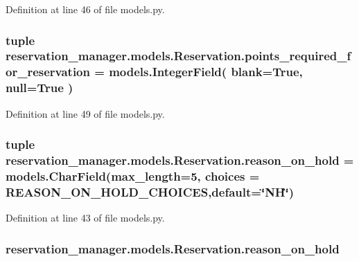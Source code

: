 Definition at line 46 of file models.\-py.

\hypertarget{classreservation__manager_1_1models_1_1Reservation_a30f975d5fa7a98aed94b7950522f912e}{
\subsubsection[{points\-\_\-required\-\_\-for\-\_\-reservation}]{\setlength{\rightskip}{0pt plus 5cm}tuple reservation\-\_\-manager.\-models.\-Reservation.\-points\-\_\-required\-\_\-for\-\_\-reservation = models.\-Integer\-Field( blank=True, null=True )\hspace{0.3cm}{\ttfamily [static]}}}\label{classreservation__manager_1_1models_1_1Reservation_a30f975d5fa7a98aed94b7950522f912e}


Definition at line 49 of file models.\-py.

\hypertarget{classreservation__manager_1_1models_1_1Reservation_a05bba6cb6791c1aadf552795174c1be7}{
\subsubsection[{reason\-\_\-on\-\_\-hold}]{\setlength{\rightskip}{0pt plus 5cm}tuple reservation\-\_\-manager.\-models.\-Reservation.\-reason\-\_\-on\-\_\-hold = models.\-Char\-Field(max\-\_\-length=5, choices = {\bf R\-E\-A\-S\-O\-N\-\_\-\-O\-N\-\_\-\-H\-O\-L\-D\-\_\-\-C\-H\-O\-I\-C\-E\-S},default=\char`\"{}N\-H\char`\"{})\hspace{0.3cm}{\ttfamily [static]}}}\label{classreservation__manager_1_1models_1_1Reservation_a05bba6cb6791c1aadf552795174c1be7}


Definition at line 43 of file models.\-py.

\hypertarget{classreservation__manager_1_1models_1_1Reservation_aae0061bbb5fade388156256d1d3676e3}{
\subsubsection[{reason\-\_\-on\-\_\-hold}]{\setlength{\rightskip}{0pt plus 5cm}reservation\-\_\-manager.\-models.\-Reservation.\-reason\-\_\-on\-\_\-hold}}\label{classreservation__manager_1_1models_1_1Reservation_aae0061bbb5fade388156256d1d3676e3}



